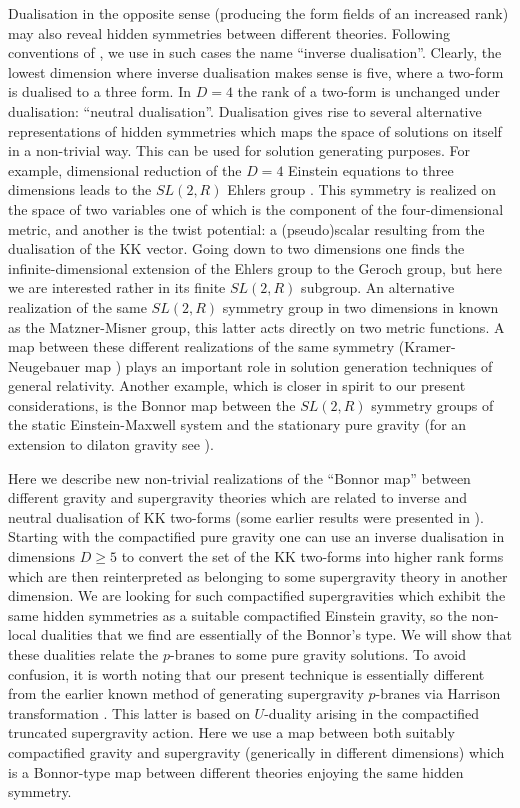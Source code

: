 \documentclass[a4paper,12pt]{article}
\begin{document}
Dualisation in the opposite sense (producing the form fields of
an increased rank) may also reveal hidden symmetries between
different theories. Following conventions of
\cite{CrJuLuPo98a,CrJuLuPo98b}, we use in such cases the name
``inverse dualisation''. Clearly, the lowest dimension where
inverse dualisation makes sense is five, where a two-form is
dualised to a three form. In $D=4$ the rank of a two-form is
unchanged under dualisation: ``neutral dualisation''.
Dualisation gives rise to several alternative representations
of hidden symmetries which maps the space of solutions on
itself in a non-trivial way. This can be used for solution
generating purposes. For example, dimensional reduction of the
$D=4$ Einstein equations to three dimensions leads to the
$SL(2,R)$ Ehlers group \cite{Eh59}. This symmetry is realized
on the space of two variables one of which is the component of
the four-dimensional metric, and another is the twist
potential: a (pseudo)scalar resulting from the dualisation of
the KK vector. Going down to two dimensions one finds the
infinite-dimensional extension of the Ehlers group to the
Geroch group, but here we are interested rather in its finite
$SL(2,R)$ subgroup. An alternative realization of the same
$SL(2,R)$ symmetry group in two dimensions in known as the
Matzner-Misner group, this latter acts directly on two metric
functions. A map between these different realizations of the
same symmetry (Kramer-Neugebauer map \cite{NeKr69}) plays an
important role in solution generation techniques of general
relativity. Another example, which is closer in spirit to our
present considerations, is the Bonnor map \cite{Bo61} between
the $SL(2,R)$ symmetry groups of the static Einstein-Maxwell
system and the stationary pure gravity (for an extension to
dilaton gravity see \cite{GaGaKe95}).

Here we describe new non-trivial realizations of the ``Bonnor
map'' between different gravity and supergravity theories which
are related to inverse and neutral dualisation of KK two-forms
(some earlier results were presented in
\cite{ChGaMaSh99,ChGaSh00}). Starting with the compactified
pure gravity one can use an inverse dualisation in dimensions
$D\geq 5$ to convert the set of the KK two-forms into higher
rank forms which are then reinterpreted as belonging to some
supergravity theory in another dimension. We are looking for
such compactified supergravities which exhibit the same hidden
symmetries as a suitable compactified Einstein gravity, so the
non-local dualities that we find are essentially of the
Bonnor's type. We will show that these dualities relate the
$p$-branes \cite{St97} to some pure gravity solutions. To avoid
confusion, it is worth noting that our present technique is
essentially different from the earlier known method of
generating supergravity $p$-branes via Harrison transformation
\cite{GaRy98}. This latter is based on $U$-duality arising in
the compactified truncated supergravity action. Here we use a
map between both suitably compactified gravity and supergravity
(generically in different dimensions) which is a Bonnor-type
map between different theories enjoying the same hidden
symmetry.
\end{document}
